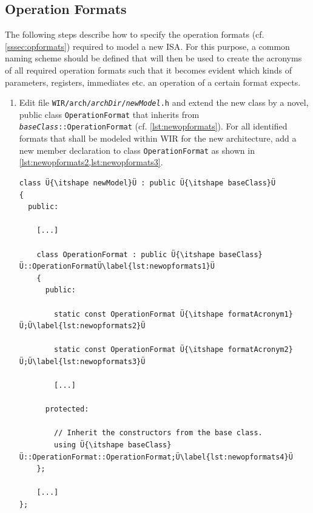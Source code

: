 \subsection{Operation Formats}
\label{ssec:newopformats}

The following steps describe how to specify the operation formats (cf. \cref{sssec:opformats}) required to model a new \gls{ISA}.
For this purpose, a common naming scheme should be defined that will then be used to create the acronyms of all required operation formats such that it becomes evident which kinds of parameters, registers, immediates etc. an operation of a certain format expects.
\begin{enumerate}[resume]
  \item Edit file \texttt{WIR/arch/{\itshape archDir}/{\itshape newModel}.h} and extend the new class by a novel, public class \texttt{Operation\-Format} that inherits from \texttt{{\itshape baseClass}::OperationFormat} (cf. \cref{lst:newopformats}). \label{enum:newopformat}
  For all identified formats that shall be modeled within \gls{WIR} for the new architecture, add a new member declaration to class \texttt{Operation\-Format} as shown in \cref{lst:newopformats2,lst:newopformats3}.

\begin{lstlisting}[style=code,float=t,caption={Declaration of a New Processor Model's Operation Formats},label=lst:newopformats]
class Ü{\itshape newModel}Ü : public Ü{\itshape baseClass}Ü
{
  public:

    [...]

    class OperationFormat : public Ü{\itshape baseClass}Ü::OperationFormatÜ\label{lst:newopformats1}Ü
    {
      public:

        static const OperationFormat Ü{\itshape formatAcronym1}Ü;Ü\label{lst:newopformats2}Ü

        static const OperationFormat Ü{\itshape formatAcronym2}Ü;Ü\label{lst:newopformats3}Ü

        [...]

      protected:

        // Inherit the constructors from the base class.
        using Ü{\itshape baseClass}Ü::OperationFormat::OperationFormat;Ü\label{lst:newopformats4}Ü
    };

    [...]
};
\end{lstlisting}


\end{enumerate}
